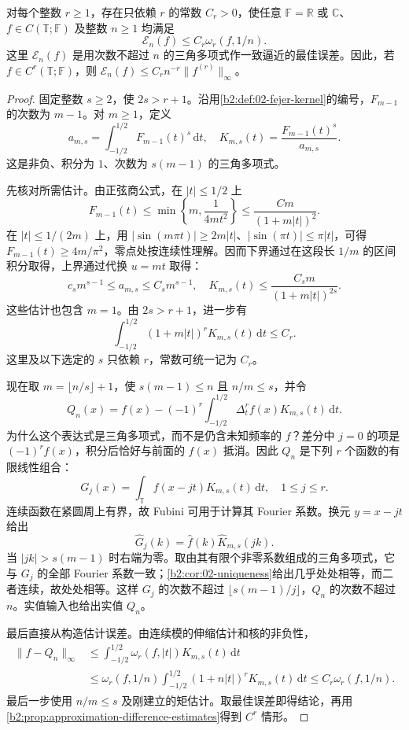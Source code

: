 \begin{theorem}\label{b2:thm:approximation-jackson-higher}
对每个整数 \(r\geq1\)，存在只依赖 \(r\) 的常数 \(C_r>0\)，使任意 \(\mathbb F=\mathbb R\) 或 \(\mathbb C\)、\(f\in C(\mathbb T;\mathbb F)\) 及整数 \(n\geq1\) 均满足
\[
 \mathcal E_n(f)\leq C_r\omega_r(f,1/n).
\]
这里 \(\mathcal E_n(f)\) 是用次数不超过 \(n\) 的三角多项式作一致逼近的最佳误差。因此，若 \(f\in C^r(\mathbb T;\mathbb F)\)，则 \(\mathcal E_n(f)\leq C_r n^{-r}\|f^{(r)}\|_\infty\)。
\end{theorem}
\begin{proof}
固定整数 \(s\geq2\)，使 \(2s>r+1\)。沿用\cref{b2:def:02-fejer-kernel}的编号，\(F_{m-1}\) 的次数为 \(m-1\)。对 \(m\geq1\)，定义
\[
 a_{m,s}=\int_{-1/2}^{1/2}F_{m-1}(t)^s\,\mathrm dt,
 \quad K_{m,s}(t)=\frac{F_{m-1}(t)^s}{a_{m,s}}.
\]
这是非负、积分为 \(1\)、次数为 \(s(m-1)\) 的三角多项式。

先核对所需估计。由正弦商公式，在 \(|t|\leq1/2\) 上
\[
 F_{m-1}(t)\leq\min\left\{m,\frac1{4mt^2}\right\}
 \leq\frac{C m}{(1+m|t|)^2}.
\]
在 \(|t|\leq1/(2m)\) 上，用 \(|\sin(m\pi t)|\geq2m|t|\)、\(|\sin(\pi t)|\leq\pi|t|\)，可得 \(F_{m-1}(t)\geq4m/\pi^2\)，零点处按连续性理解。因而下界通过在这段长 \(1/m\) 的区间积分取得，上界通过代换 \(u=mt\) 取得：
\[
 c_s m^{s-1}\leq a_{m,s}\leq C_s m^{s-1},
 \quad K_{m,s}(t)\leq\frac{C_s m}{(1+m|t|)^{2s}}.
\]
这些估计也包含 \(m=1\)。由 \(2s>r+1\)，进一步有
\[
 \int_{-1/2}^{1/2}(1+m|t|)^rK_{m,s}(t)\,\mathrm dt\leq C_r.
\]
这里及以下选定的 \(s\) 只依赖 \(r\)，常数可统一记为 \(C_r\)。

现在取 \(m=\lfloor n/s\rfloor+1\)，使 \(s(m-1)\leq n\) 且 \(n/m\leq s\)，并令
\[
 Q_n(x)=f(x)-(-1)^r\int_{-1/2}^{1/2}\Delta_t^r f(x)K_{m,s}(t)\,\mathrm dt.
\]
为什么这个表达式是三角多项式，而不是仍含未知频率的 \(f\)？差分中 \(j=0\) 的项是 \((-1)^rf(x)\)，积分后恰好与前面的 \(f(x)\) 抵消。因此 \(Q_n\) 是下列 \(r\) 个函数的有限线性组合：
\[
 G_j(x)=\int_{\mathbb T}f(x-jt)K_{m,s}(t)\,\mathrm dt,
 \quad 1\leq j\leq r.
\]
连续函数在紧圆周上有界，故 Fubini 可用于计算其 Fourier 系数。换元 \(y=x-jt\) 给出
\[
 \widehat G_j(k)=\widehat f(k)\widehat K_{m,s}(jk).
\]
当 \(|jk|>s(m-1)\) 时右端为零。取由其有限个非零系数组成的三角多项式，它与 \(G_j\) 的全部 Fourier 系数一致；\cref{b2:cor:02-uniqueness}给出几乎处处相等，而二者连续，故处处相等。这样 \(G_j\) 的次数不超过 \(\lfloor s(m-1)/j\rfloor\)，\(Q_n\) 的次数不超过 \(n\)。实值输入也给出实值 \(Q_n\)。

最后直接从构造估计误差。由连续模的伸缩估计和核的非负性，
\[
 \begin{aligned}
 \|f-Q_n\|_\infty
 &\leq\int_{-1/2}^{1/2}\omega_r(f,|t|)K_{m,s}(t)\,\mathrm dt\\
 &\leq\omega_r(f,1/n)
       \int_{-1/2}^{1/2}(1+n|t|)^rK_{m,s}(t)\,\mathrm dt
 \leq C_r\omega_r(f,1/n).
 \end{aligned}
\]
最后一步使用 \(n/m\leq s\) 及刚建立的矩估计。取最佳误差即得结论，再用\cref{b2:prop:approximation-difference-estimates}得到 \(C^r\) 情形。
\end{proof}

